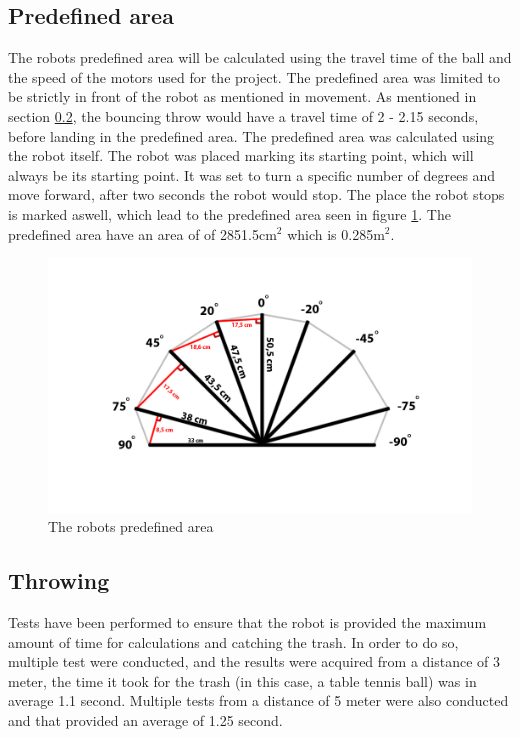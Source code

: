 \subsection{Predefined area}
\label{sec:i1Predefined areaImplementation}
The robots predefined area will be calculated using the travel time of the ball and the speed of the motors used for the project. 
The predefined area was limited to be strictly in front of the robot as mentioned in movement.
As mentioned in  section \ref{sec:i1ThrowingImplementation}, the bouncing throw would have a travel time of 2 - 2.15 seconds, before landing in the predefined area. The predefined area was calculated using the robot itself. The robot was placed marking its starting point, which will always be its starting point. It was set to turn a specific number of degrees and move forward, after two seconds the robot would stop. The place the robot stops is marked aswell, which lead to the predefined area seen in figure \ref{figure:Predefined area}. The predefined area have an area of of 2851.5cm\begin{math}^2\end{math} which is 0.285m\begin{math}^2\end{math}.

\begin{figure}[h]
\centering
\includegraphics[scale=0.35]{billeder/predefined-area}
\caption{The robots predefined area}
\label{figure:Predefined area}
\end{figure}

\subsection{Throwing}
\label{sec:i1ThrowingImplementation}
Tests have been performed to ensure that the robot is provided the maximum amount of time for calculations and catching the trash. In order to do so, multiple test were conducted, and the results were acquired from a distance of 3 meter, the time it took for the trash (in this case, a table tennis ball) was in average 1.1 second. Multiple tests from a distance of 5 meter were also conducted and that provided an average of 1.25 second. 

